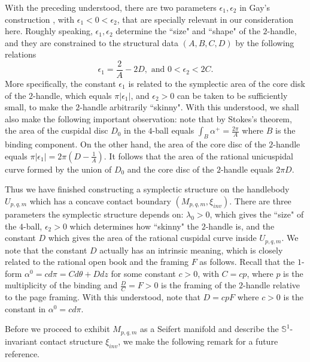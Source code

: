 \documentclass[11pt]{amsart}
\theoremstyle{plain}
\numberwithin{theorem}{section}
\theoremstyle{definition}
\newcommand{\s}{{\mathbb S}}
\begin{document}
With the preceding understood, there are two parameters $\epsilon_1,\epsilon_2$ in Gay's construction , 
with $\epsilon_1<0<\epsilon_2$, that are specially relevant in our consideration here. Roughly speaking, $\epsilon_1,\epsilon_2$ determine the ``size" and ``shape" of the $2$-handle, and they are constrained to the structural data $(A,B,C,D)$ by the following relations
$$
\epsilon_1=\frac{2}{A}-2D, \mbox{ and } 0<\epsilon_2<2C. 
$$
More specifically, the constant $\epsilon_1$ is related to the symplectic area of the core disk 
of the $2$-handle, which equals $\pi|\epsilon_1|$, and $\epsilon_2>0$ can be taken to be sufficiently small, 
to make the $2$-handle arbitrarily ``skinny". With this understood, we shall also make the following important
observation: note that by Stokes's theorem, the area of the cuspidal disc $D_0$ in the $4$-ball equals 
$\int_B \alpha^{+}=\frac{2\pi}{A}$ where $B$ is the binding component. On the other hand, the area of the 
core disc of the $2$-handle equals $\pi |\epsilon_1|= 2\pi(D-\frac{1}{A})$. It follows that the area of the rational unicuspidal curve formed by the union of $D_0$ and the core disc of the $2$-handle equals $2\pi D$. 

Thus we have finished constructing a symplectic structure on the handlebody $U_{p,q,m}$ which has a concave contact boundary $(M_{p,q,m},\xi_{inv})$. There are three parameters the symplectic structure depends on:
$\lambda_0>0$, which gives the ``size" of the $4$-ball, $\epsilon_2>0$ which determines how ``skinny" the $2$-handle is, and the constant $D$ which gives the area of the rational cuspidal curve inside $U_{p,q,m}$. We note 
that the constant $D$ actually has an intrinsic meaning, which is closely related to the rational open book and 
the framing $F$ as follows. Recall that the $1$-form $\alpha^0=cd\pi=Cd\theta+D dz$ for some constant $c>0$, 
with $C=cp$,  where $p$ is the multiplicity of the binding and $\frac{D}{C}=F>0$ is the framing of the $2$-handle relative to the page framing. With this understood, note that $D=cpF$ where $c>0$ is the constant in 
$\alpha^0=c d\pi$. 

Before we proceed to exhibit $M_{p,q,m}$ as a Seifert manifold and describe the $\s^1$-invariant contact
structure $\xi_{inv}$, we make the following remark for a future reference. 
\end{document}
